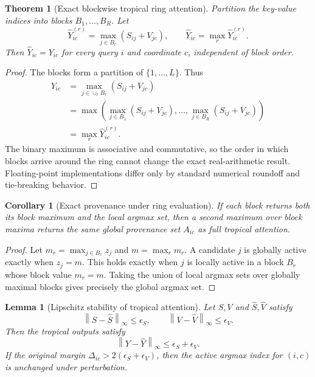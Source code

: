 \documentclass[11pt]{article}
\theoremstyle{definition}
\theoremstyle{plain}
\newtheorem{theorem}[definition]{Theorem}
\newtheorem{lemma}[definition]{Lemma}
\newtheorem{corollary}[definition]{Corollary}
\theoremstyle{remark}
\numberwithin{equation}{section}
\newcommand{\norm}[1]{\left\lVert #1\right\rVert}
\begin{document}
\begin{theorem}[Exact blockwise tropical ring attention]
Partition the key-value indices into blocks $B_1,\ldots,B_R$.  Let
\begin{equation}
  \widehat Y_{ic}^{(r)}=\max_{j\in B_r}(S_{ij}+V_{jc}),\qquad
  \widehat Y_{ic}=\max_r\widehat Y_{ic}^{(r)}.
\end{equation}
Then $\widehat Y_{ic}=Y_{ic}$ for every query $i$ and coordinate $c$, independent of block order.
\end{theorem}

\begin{proof}
The blocks form a partition of $\{1,\ldots,L\}$.  Thus
\begin{align}
Y_{ic}
&=\max_{j\in\cup_r B_r}(S_{ij}+V_{jc})\\
&=\max\left(\max_{j\in B_1}(S_{ij}+V_{jc}),\ldots,\max_{j\in B_R}(S_{ij}+V_{jc})\right)\\
&=\max_r\widehat Y_{ic}^{(r)}.
\end{align}
The binary maximum is associative and commutative, so the order in which blocks arrive around the ring cannot change the exact real-arithmetic result.  Floating-point implementations differ only by standard numerical roundoff and tie-breaking behavior.
\end{proof}

\begin{corollary}[Exact provenance under ring evaluation]
If each block returns both its block maximum and the local argmax set, then a second maximum over block maxima returns the same global provenance set $A_{ic}$ as full tropical attention.
\end{corollary}

\begin{proof}
Let $m_r=\max_{j\in B_r}z_j$ and $m=\max_r m_r$.  A candidate $j$ is globally active exactly when $z_j=m$.  This holds exactly when $j$ is locally active in a block $B_r$ whose block value $m_r=m$.  Taking the union of local argmax sets over globally maximal blocks gives precisely the global argmax set.
\end{proof}

\begin{lemma}[Lipschitz stability of tropical attention]
Let $S,V$ and $\widehat S,\widehat V$ satisfy
\begin{equation}
  \norm{S-\widehat S}_{\infty}\le\epsilon_S,
  \qquad \norm{V-\widehat V}_{\infty}\le\epsilon_V.
\end{equation}
Then the tropical outputs satisfy
\begin{equation}
  \norm{Y-\widehat Y}_{\infty}\le \epsilon_S+\epsilon_V.
\end{equation}
If the original margin $\Delta_{ic}>2(\epsilon_S+\epsilon_V)$, then the active argmax index for $(i,c)$ is unchanged under perturbation.
\end{lemma}
\end{document}
